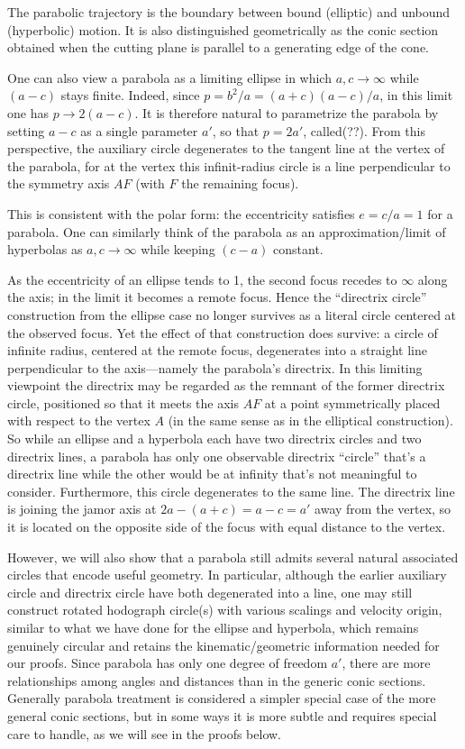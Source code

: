 The parabolic trajectory is the boundary between bound (elliptic) and unbound (hyperbolic) motion.
It is also distinguished geometrically as the conic section obtained when the cutting plane is parallel to a generating edge of the cone.

One can also view a parabola as a limiting ellipse in which $a,c\to\infty$ while $(a\!-\!c)$ stays finite.
Indeed, since $p=b^2/a=(a+c)(a-c)/a$, in this limit one has $p\to 2(a-c)$.
It is therefore natural to parametrize the parabola by setting $a-c$ as a single parameter $a'$, so that $p=2a'$, called(??). From this perspective, the auxiliary circle degenerates to the tangent line at the vertex of the parabola, for at the vertex this infinit-radius circle is a line perpendicular to the symmetry axis $AF$ (with $F$ the remaining focus).

This is consistent with the polar form: the eccentricity satisfies $e=c/a=1$ for a parabola. One can similarly think of the parabola as an approximation/limit of hyperbolas as $a,c\to \infty$ while keeping $(c\!-a)$ constant.

As the eccentricity of an ellipse tends to 1, the second focus recedes to $\infty$ along the axis; in the limit it becomes a remote focus. Hence the “directrix circle” construction from the ellipse case no longer survives as a literal circle centered at the observed focus.
Yet the effect of that construction does survive: a circle of infinite radius, centered at the remote focus, degenerates into a straight line perpendicular to the axis—namely the parabola’s directrix. In this limiting viewpoint the directrix may be regarded as the remnant of the former directrix circle, positioned so that it meets the axis
$AF$ at a point symmetrically placed with respect to the vertex
$A$ (in the same sense as in the elliptical construction). So while an ellipse and a hyperbola each have two directrix circles and two directrix lines, a parabola has only one observable directrix ``circle'' that's a directrix line while the other would be at infinity that's not meaningful to consider. Furthermore, this circle degenerates to the same line. The directrix line is joining the jamor axis at $2a-(a+c) = a-c=a'$ away from the vertex, so it is located on the opposite side of the focus with equal distance to the vertex.

However, we will also show that a parabola still admits several natural associated circles that encode useful geometry. In particular, although the earlier auxiliary circle and directrix circle have both degenerated into a line, one may still construct rotated hodograph circle(s) with various scalings and velocity origin, similar to what we have done for the ellipse and hyperbola, which remains genuinely circular and retains the kinematic/geometric information needed for our proofs. Since parabola has only one degree of freedom $a'$, there are more relationships among angles and distances than in the generic conic sections. Generally parabola treatment is considered a simpler special case of the more general conic sections, but in some ways it is more subtle and requires special care to handle, as we will see in the proofs below.

